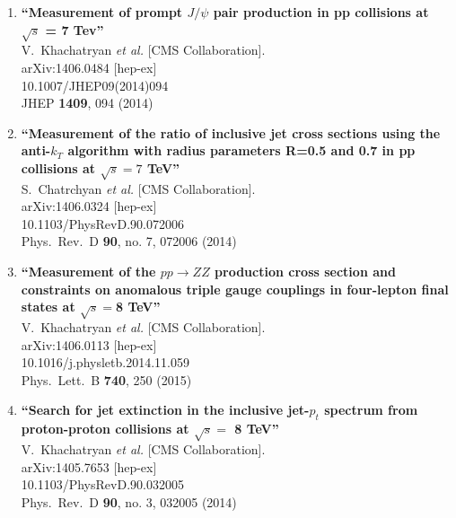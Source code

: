 \documentclass{article}
\begin{document}
\begin{enumerate}
\item%
{\bf ``Measurement of prompt $J/\psi$ pair production in pp collisions at $ \sqrt{s} $ = 7 Tev''}
  \\{}V.~Khachatryan {\it et al.}  [CMS Collaboration].
  \\{}arXiv:1406.0484 [hep-ex]
    \\{}10.1007/JHEP09(2014)094
\\{}JHEP {\bf 1409}, 094 (2014) %


\item%
{\bf ``Measurement of the ratio of inclusive jet cross sections using the anti-$k_T$ algorithm with radius parameters R=0.5 and 0.7 in pp collisions at $\sqrt{s}=7$  TeV''}
  \\{}S.~Chatrchyan {\it et al.}  [CMS Collaboration].
  \\{}arXiv:1406.0324 [hep-ex]
    \\{}10.1103/PhysRevD.90.072006
\\{}Phys.\ Rev.\ D {\bf 90}, no. 7, 072006 (2014) %


\item%
{\bf ``Measurement of the $pp \to ZZ$ production cross section and constraints on anomalous triple gauge couplings in four-lepton final states at $\sqrt s=$8 TeV''}
  \\{}V.~Khachatryan {\it et al.}  [CMS Collaboration].
  \\{}arXiv:1406.0113 [hep-ex]
    \\{}10.1016/j.physletb.2014.11.059
\\{}Phys.\ Lett.\ B {\bf 740}, 250 (2015) %


\item%
{\bf ``Search for jet extinction in the inclusive jet-$p_t$ spectrum from proton-proton collisions at $\sqrt s =$ 8 TeV''}
  \\{}V.~Khachatryan {\it et al.}  [CMS Collaboration].
  \\{}arXiv:1405.7653 [hep-ex]
    \\{}10.1103/PhysRevD.90.032005
\\{}Phys.\ Rev.\ D {\bf 90}, no. 3, 032005 (2014) %




\end{enumerate}
\end{document}
